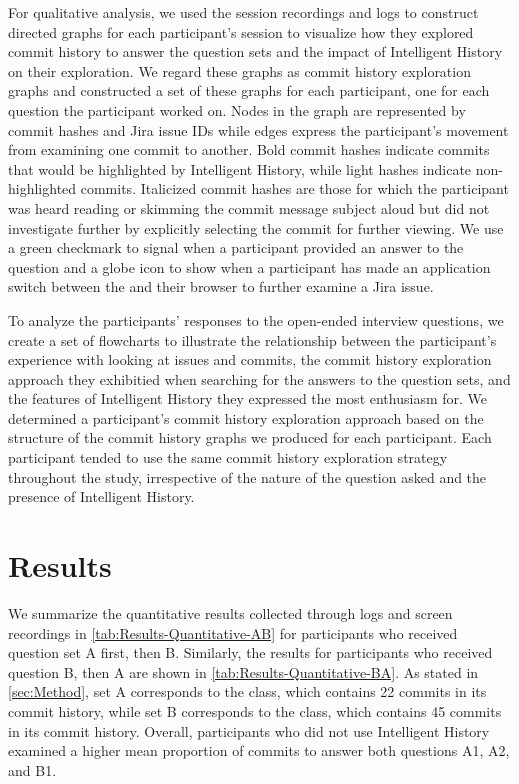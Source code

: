 For qualitative analysis, we used the session recordings and logs to construct directed graphs for each participant's session to visualize how they explored commit history to answer the question sets and the impact of Intelligent History on their exploration.
We regard these graphs as commit history exploration graphs and constructed a set of these graphs for each participant, one for each question the participant worked on.
Nodes in the graph are represented by commit hashes and Jira issue IDs while edges express the participant's movement from examining one commit to another.
Bold commit hashes indicate commits that would be highlighted by Intelligent History, while light hashes indicate non-highlighted commits.
Italicized commit hashes are those for which the participant was heard reading or skimming the commit message subject aloud but did not investigate further by explicitly selecting the commit for further viewing.
We use a green checkmark to signal when a participant provided an answer to the question and a globe icon to show when a participant has made an application switch between the  and their browser to further examine a Jira issue.

To analyze the participants' responses to the open-ended interview questions, we create a set of flowcharts to illustrate the relationship between the participant's experience with looking at issues and commits,
the commit history exploration approach they exhibitied when searching for the answers to the question sets, and the features of Intelligent History they expressed the most enthusiasm for.
We determined a participant's commit history exploration approach based on the structure of the commit history graphs we produced for each participant.
Each participant tended to use the same commit history exploration strategy throughout the study, irrespective of the nature of the question asked and the presence of Intelligent History.

\section{Results}
\label{sec:Results}

We summarize the quantitative results collected through logs and screen recordings in \autoref{tab:Results-Quantitative-AB} for participants who received question set A first, then B.
Similarly, the results for participants who received question B, then A are shown in \autoref{tab:Results-Quantitative-BA}.
As stated in \autoref{sec:Method}, set A corresponds to the  class, which contains 22 commits in its commit history, 
while set B corresponds to the  class, which contains 45 commits in its commit history.
Overall, participants who did not use Intelligent History examined a higher mean proportion of commits to answer both questions A1, A2, and B1.


